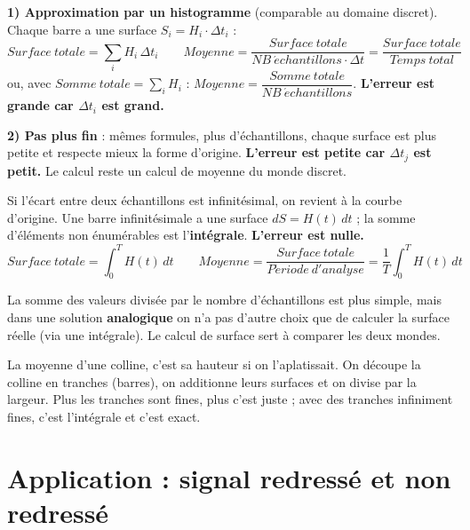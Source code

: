 
\textbf{1) Approximation par un histogramme} (comparable au domaine discret). Chaque barre a
une surface $S_i = H_i\cdot\Delta t_i$ :
\[ Surface\ totale = \sum_i H_i\,\Delta t_i \qquad
   Moyenne = \frac{Surface\ totale}{NB\ \acute{e}chantillons\cdot\Delta t}
           = \frac{Surface\ totale}{Temps\ total} \]
ou, avec $Somme\ totale = \sum_i H_i$ : $Moyenne = \dfrac{Somme\ totale}{NB\ \acute{e}chantillons}$.
\textbf{L'erreur est grande car $\Delta t_i$ est grand.}


\textbf{2) Pas plus fin} : mêmes formules, plus d'échantillons, chaque surface est plus
petite et respecte mieux la forme d'origine. \textbf{L'erreur est petite car $\Delta t_j$
est petit.} Le calcul reste un calcul de moyenne du monde discret.


\begin{thmbox}[title=3) Pas infinitésimal : la valeur moyenne]
Si l'écart entre deux échantillons est infinitésimal, on revient à la courbe d'origine.
Une barre infinitésimale a une surface $dS = H(t)\,dt$ ; la somme d'éléments non
énumérables est l'\textbf{intégrale}. \textbf{L'erreur est nulle.}
\[ Surface\ totale = \int_0^T H(t)\,dt \qquad
   Moyenne = \frac{Surface\ totale}{P\acute{e}riode\ d'analyse} = \frac{1}{T}\int_0^T H(t)\,dt \]
\end{thmbox}

\begin{rembox}[title={Pourquoi passer par la surface divisée par le temps ?}]
La somme des valeurs divisée par le nombre d'échantillons est plus simple, mais dans une
solution \textbf{analogique} on n'a pas d'autre choix que de calculer la surface réelle (via
une intégrale). Le calcul de surface sert à comparer les deux mondes.
\end{rembox}

\begin{goatbox}
La moyenne d'une colline, c'est sa hauteur \og si on l'aplatissait\fg{}. On découpe la
colline en tranches (barres), on additionne leurs surfaces et on divise par la largeur. Plus
les tranches sont fines, plus c'est juste ; avec des tranches infiniment fines, c'est
l'intégrale et c'est exact.
\end{goatbox}

\section{Application : signal redressé et non redressé}

